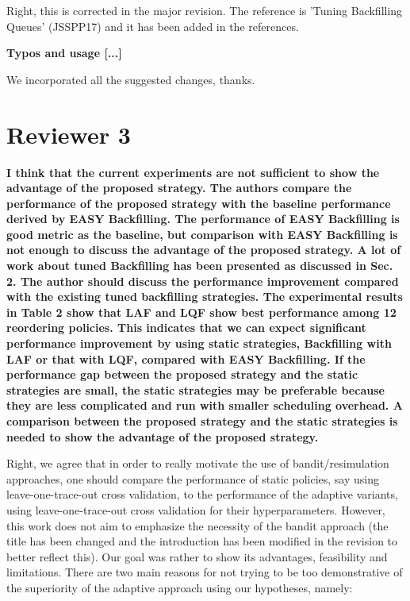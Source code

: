 \documentclass[]{article}
\begin{document}
Right, this is corrected in the major revision. The reference is 'Tuning Backfilling Queues' (JSSPP17)
and it has been added in the references.
\medskip

\textbf{Typos and usage [...]}

We incorporated all the suggested changes, thanks.
\medskip


\section{Reviewer 3}

\textbf{I think that the current experiments are not sufficient to show the advantage of the proposed strategy.
The authors compare the performance of the proposed strategy with the baseline performance derived by EASY Backfilling. The performance of EASY Backfilling is good metric as the baseline, but comparison with EASY Backfilling is not enough to discuss the advantage of the proposed strategy. A lot of work about tuned Backfilling has been presented as discussed in Sec. 2. The author should discuss the performance improvement compared with the existing tuned backfilling strategies.
The experimental results in Table 2 show that LAF and LQF show best performance among 12 reordering policies. This indicates that we can expect significant performance improvement by using static strategies, Backfilling with LAF or that with LQF, compared with EASY Backfilling. If the performance gap between the proposed strategy and the static strategies are small, the static strategies may be preferable because they are less complicated and run with smaller scheduling overhead. A comparison between the proposed strategy and the static strategies is needed to show the advantage of the proposed strategy.}

Right, we agree that in order to really motivate the use of
bandit/resimulation approaches, one should compare the performance of static
policies, say using leave-one-trace-out cross validation, to the performance of
the adaptive variants, using leave-one-trace-out cross validation for their
hyperparameters.
However, this work does not aim to emphasize the necessity of the bandit
approach (the title has been changed and the introduction has been modified in the 
revision to better reflect this). Our goal was rather to show its advantages,
feasibility and limitations. 
There are two main reasons for not trying to be too demonstrative of the superiority
of the adaptive approach using our hypotheses, namely:
\end{document}
